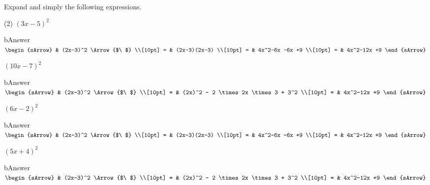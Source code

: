 \clearpage\noindent%
Expand and simply the following expressions.
\begin{mtask}(2)
      \task[] $(3x-5)^2$
              \begin{envOut}[equal height group=A-Rev-1]{bAnswer}
			       $\begin{sArrow}
			             & (2x-3)^2         \Arrow{$\ $} \\[10pt]     %
                       = & (2x-3)(2x-3)                  \\[10pt]      
					   = & 4x^2-6x -6x +9                \\[10pt]
					   = & 4x^2-12x +9
	                \end{sArrow}$
              \end{envOut}
      \task[] $(10x-7)^2$
              \begin{envOut}[equal height group=A-Rev-1]{bAnswer}
			       $\begin{sArrow}
			             & (2x-3)^2         \Arrow{$\ $}        \\[10pt]
                       = & (2x)^2 - 2 \times 2x \times 3 + 3^2  \\[10pt]      
					   = & 4x^2-12x +9
	                \end{sArrow}$
              \end{envOut}
      \task[] $(6x-2)^2$
              \begin{envOut}[equal height group=A-Rev-1]{bAnswer}
			       $\begin{sArrow}
			             & (2x-3)^2         \Arrow{$\ $} \\[10pt]     %
                       = & (2x-3)(2x-3)                  \\[10pt]      
					   = & 4x^2-6x -6x +9                \\[10pt]
					   = & 4x^2-12x +9
	                \end{sArrow}$
              \end{envOut}
      \task[] $(5x+4)^2$
              \begin{envOut}[equal height group=A-Rev-1]{bAnswer}
			       $\begin{sArrow}
			             & (2x-3)^2         \Arrow{$\ $}        \\[10pt]
                       = & (2x)^2 - 2 \times 2x \times 3 + 3^2  \\[10pt]      
					   = & 4x^2-12x +9
	                \end{sArrow}$
              \end{envOut}

\end{mtask}
